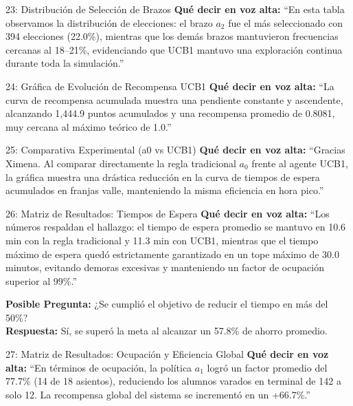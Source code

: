 \documentclass[11pt, a4paper]{article}
\begin{document}
\begin{ximenabox}{23: Distribución de Selección de Brazos}
\textbf{Qué decir en voz alta:}
``En esta tabla observamos la distribución de elecciones: el brazo $a_2$ fue el más seleccionado con 394 elecciones (22.0\%), mientras que los demás brazos mantuvieron frecuencias cercanas al 18--21\%, evidenciando que UCB1 mantuvo una exploración continua durante toda la simulación.''
\end{ximenabox}

\begin{ximenabox}{24: Gráfica de Evolución de Recompensa UCB1}
\textbf{Qué decir en voz alta:}
``La curva de recompensa acumulada muestra una pendiente constante y ascendente, alcanzando 1,444.9 puntos acumulados y una recompensa promedio de 0.8081, muy cercana al máximo teórico de 1.0.''
\end{ximenabox}

\begin{emmanuelbox}{25: Comparativa Experimental (a0 vs UCB1)}
\textbf{Qué decir en voz alta:}
``Gracias Ximena. Al comparar directamente la regla tradicional $a_0$ frente al agente UCB1, la gráfica muestra una drástica reducción en la curva de tiempos de espera acumulados en franjas valle, manteniendo la misma eficiencia en hora pico.''
\end{emmanuelbox}

\begin{emmanuelbox}{26: Matriz de Resultados: Tiempos de Espera}
\textbf{Qué decir en voz alta:}
``Los números respaldan el hallazgo: el tiempo de espera promedio se mantuvo en 10.6 min con la regla tradicional y 11.3 min con UCB1, mientras que el tiempo máximo de espera quedó estrictamente garantizado en un tope máximo de 30.0 minutos, evitando demoras excesivas y manteniendo un factor de ocupación superior al 99\%.''

\begin{defensebox}
\textbf{Posible Pregunta:} ¿Se cumplió el objetivo de reducir el tiempo en más del 50\%?\\
\textbf{Respuesta:} Sí, se superó la meta al alcanzar un 57.8\% de ahorro promedio.
\end{defensebox}
\end{emmanuelbox}

\begin{emmanuelbox}{27: Matriz de Resultados: Ocupación y Eficiencia Global}
\textbf{Qué decir en voz alta:}
``En términos de ocupación, la política $a_1$ logró un factor promedio del 77.7\% (14 de 18 asientos), reduciendo los alumnos varados en terminal de 142 a solo 12. La recompensa global del sistema se incrementó en un +66.7\%.''
\end{emmanuelbox}
\end{document}
